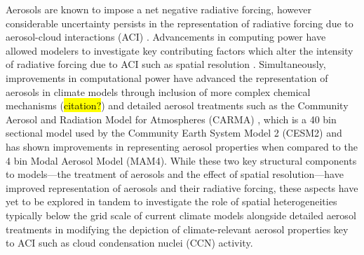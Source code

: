 \documentclass[journal abbreviation, manuscript]{copernicus}
\begin{document}
Aerosols are known to impose a net negative radiative forcing, however considerable uncertainty persists in the representation of radiative forcing due to aerosol-cloud interactions (ACI) \citep{ipcc_report_2021}. Advancements in computing power have allowed modelers to investigate key contributing factors which alter the intensity of radiative forcing due to ACI such as spatial resolution \citep{ma_how_2015}. Simultaneously, improvements in computational power have advanced the representation of aerosols in climate models through inclusion of more complex chemical mechanisms (\hl{citation?}) and detailed aerosol treatments such as the Community Aerosol and Radiation Model for Atmospheres (CARMA) , which is a 40 bin sectional model used by the Community Earth System Model 2 (CESM2) \citep{tilmes_description_2023} and has shown improvements in representing aerosol properties when compared to the 4 bin Modal Aerosol Model (MAM4). While these two key structural components to models---the treatment of aerosols and the effect of spatial resolution---have improved representation of aerosols and their radiative forcing, these aspects have yet to be explored in tandem to investigate the role of spatial heterogeneities typically below the grid scale of current climate models alongside detailed aerosol treatments in modifying the depiction of climate-relevant aerosol properties key to ACI such as cloud condensation nuclei (CCN) activity.

\end{document}
